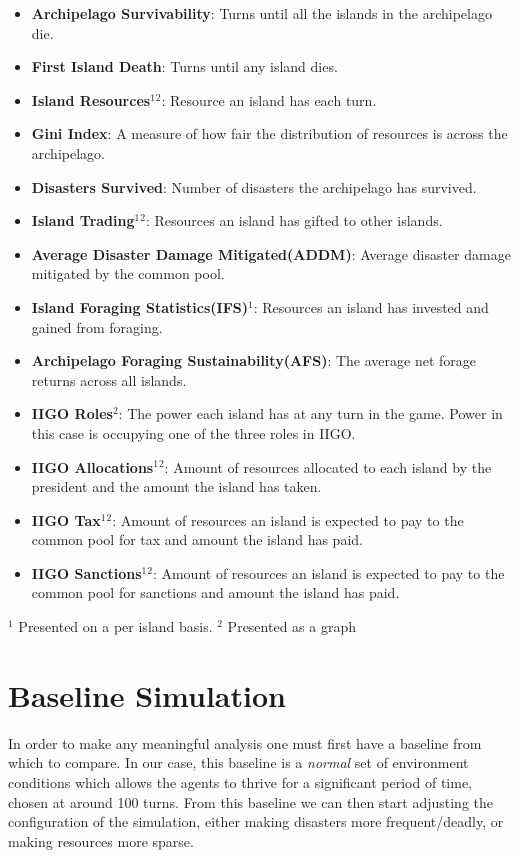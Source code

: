 \begin{itemize}
    \item \textbf{Archipelago Survivability}: Turns until all the islands in the archipelago die.
    \item \textbf{First Island Death}: Turns until any island dies.
    \item \textbf{Island Resources$^1$$^2$}: Resource an island has each turn.
    \item \textbf{Gini Index}: A measure of how fair the distribution of resources is across the archipelago.
    \item \textbf{Disasters Survived}: Number of disasters the archipelago has survived.
    \item \textbf{Island Trading$^1$$^2$}: Resources an island has gifted to other islands.
    \item \textbf{Average Disaster Damage Mitigated(ADDM)}: Average disaster damage mitigated by the common pool.
    \item \textbf{Island Foraging Statistics(IFS)$^1$}: Resources an island has invested and gained from foraging.
    \item \textbf{Archipelago Foraging Sustainability(AFS)}: The average net forage returns across all islands.
    \item \textbf{IIGO Roles$^2$}: The power each island has at any turn in the game. Power in this case is occupying one of the three roles in IIGO.
    \item \textbf{IIGO Allocations$^1$$^2$}: Amount of resources allocated to each island by the president and the amount the island has taken.
    \item \textbf{IIGO Tax$^1$$^2$}: Amount of resources an island is expected to pay to the common pool for tax and amount the island has paid.
    \item \textbf{IIGO Sanctions$^1$$^2$}: Amount of resources an island is expected to pay to the common pool for sanctions and amount the island has paid.
    
\end{itemize}
\small{$^1$ Presented on a per island basis. $^2$ Presented as a graph}

\section{Baseline Simulation}
\label{sec:Simulations:baseline}

In order to make any meaningful analysis one must first have a baseline from which to compare. In our case, this baseline is a \emph{normal} set of environment conditions which allows the agents to thrive for a significant period of time, chosen at around 100 turns. From this baseline we can then start adjusting the configuration of the simulation, either making disasters more frequent/deadly, or making resources more sparse.

